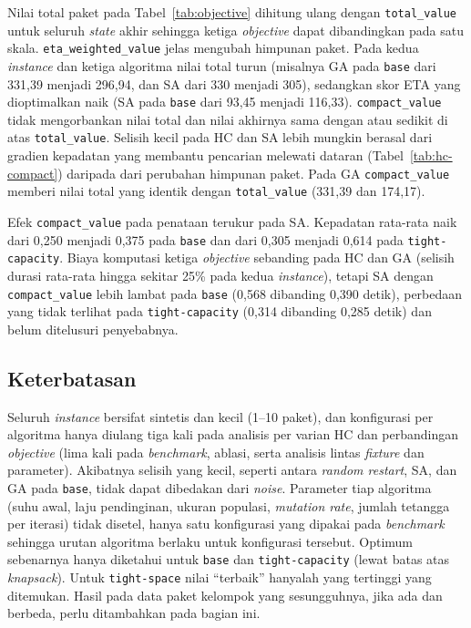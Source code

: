 Nilai total paket pada Tabel~\ref{tab:objective} dihitung ulang dengan \texttt{total\_value} untuk seluruh \textit{state} akhir sehingga ketiga \textit{objective} dapat dibandingkan pada satu skala. \texttt{eta\_weighted\_value} jelas mengubah himpunan paket. Pada kedua \textit{instance} dan ketiga algoritma nilai total turun (misalnya GA pada \texttt{base} dari 331,39 menjadi 296,94, dan SA dari 330 menjadi 305), sedangkan skor ETA yang dioptimalkan naik (SA pada \texttt{base} dari 93,45 menjadi 116,33). \texttt{compact\_value} tidak mengorbankan nilai total dan nilai akhirnya sama dengan atau sedikit di atas \texttt{total\_value}. Selisih kecil pada HC dan SA lebih mungkin berasal dari gradien kepadatan yang membantu pencarian melewati dataran (Tabel~\ref{tab:hc-compact}) daripada dari perubahan himpunan paket. Pada GA \texttt{compact\_value} memberi nilai total yang identik dengan \texttt{total\_value} (331,39 dan 174,17).

Efek \texttt{compact\_value} pada penataan terukur pada SA. Kepadatan rata-rata naik dari 0,250 menjadi 0,375 pada \texttt{base} dan dari 0,305 menjadi 0,614 pada \texttt{tight-capacity}. Biaya komputasi ketiga \textit{objective} sebanding pada HC dan GA (selisih durasi rata-rata hingga sekitar 25\% pada kedua \textit{instance}), tetapi SA dengan \texttt{compact\_value} lebih lambat pada \texttt{base} (0,568 dibanding 0,390 detik), perbedaan yang tidak terlihat pada \texttt{tight-capacity} (0,314 dibanding 0,285 detik) dan belum ditelusuri penyebabnya.

\subsection{Keterbatasan}
Seluruh \textit{instance} bersifat sintetis dan kecil (1--10 paket), dan konfigurasi per algoritma hanya diulang tiga kali pada analisis per varian HC dan perbandingan \textit{objective} (lima kali pada \textit{benchmark}, ablasi, serta analisis lintas \textit{fixture} dan parameter). Akibatnya selisih yang kecil, seperti antara \textit{random restart}, SA, dan GA pada \texttt{base}, tidak dapat dibedakan dari \textit{noise}. Parameter tiap algoritma (suhu awal, laju pendinginan, ukuran populasi, \textit{mutation rate}, jumlah tetangga per iterasi) tidak disetel, hanya satu konfigurasi yang dipakai pada \textit{benchmark} sehingga urutan algoritma berlaku untuk konfigurasi tersebut. Optimum sebenarnya hanya diketahui untuk \texttt{base} dan \texttt{tight-capacity} (lewat batas atas \textit{knapsack}). Untuk \texttt{tight-space} nilai ``terbaik'' hanyalah yang tertinggi yang ditemukan. Hasil pada data paket kelompok yang sesungguhnya, jika ada dan berbeda, perlu ditambahkan pada bagian ini.

